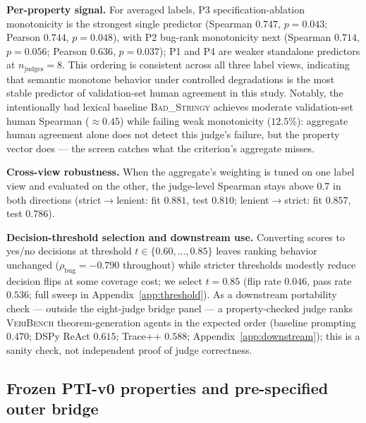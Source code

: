 \documentclass{article}
\begin{document}
\textbf{Per-property signal.}
For averaged labels, P3 specification-ablation monotonicity is the strongest single predictor (Spearman $0.747$, $p=0.043$; Pearson $0.744$, $p=0.048$), with P2 bug-rank monotonicity next (Spearman $0.714$, $p=0.056$; Pearson $0.636$, $p=0.037$); P1 and P4 are weaker standalone predictors at $n_{\text{judges}}=8$.
This ordering is consistent across all three label views, indicating that semantic monotone behavior under controlled degradations is the most stable predictor of validation-set human agreement in this study.
Notably, the intentionally bad lexical baseline \textsc{Bad\_Stringy} achieves moderate validation-set human Spearman ($\approx 0.45$) while failing weak monotonicity ($12.5\%$): aggregate human agreement alone does not detect this judge's failure, but the property vector does --- the screen catches what the criterion's aggregate misses.

\textbf{Cross-view robustness.}
When the aggregate's weighting is tuned on one label view and evaluated on the other, the judge-level Spearman stays above $0.7$ in both directions (strict$\rightarrow$lenient: fit $0.881$, test $0.810$; lenient$\rightarrow$strict: fit $0.857$, test $0.786$).

\textbf{Decision-threshold selection and downstream use.}
Converting scores to yes/no decisions at threshold $t \in \{0.60,\dots,0.85\}$ leaves ranking behavior unchanged ($\rho_{\text{bug}}=-0.790$ throughout) while stricter thresholds modestly reduce decision flips at some coverage cost; we select $t=0.85$ (flip rate $0.046$, pass rate $0.536$; full sweep in Appendix~\ref{app:threshold}).
As a downstream portability check --- outside the eight-judge bridge panel --- a property-checked judge ranks \textsc{VeriBench} theorem-generation agents in the expected order (baseline prompting $0.470$; DSPy ReAct $0.615$; Trace++ $0.588$; Appendix~\ref{app:downstream}); this is a sanity check, not independent proof of judge correctness.
\fi

\subsection{Frozen PTI-v0 properties and pre-specified outer bridge}\label{sec:bridge}
\end{document}
